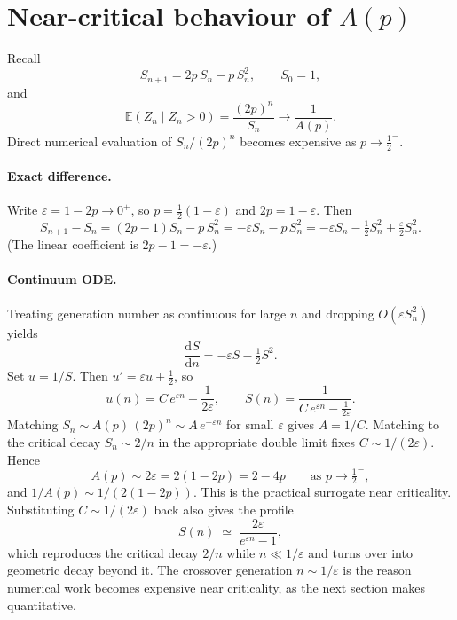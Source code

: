\section{Near-critical behaviour of \texorpdfstring{$A(p)$}{A(p)}}
\label{sec:nearcrit}

Recall
\[
S_{n+1}=2p\,S_n-p\,S_n^2,\qquad S_0=1,
\]
and
\[
\mathbb{E}(Z_n\mid Z_n>0)=\frac{(2p)^n}{S_n}\to\frac{1}{A(p)} .
\]
Direct numerical evaluation of $S_n/(2p)^n$ becomes expensive as $p\to\tfrac12^-$.

\paragraph{Exact difference.}
Write $\varepsilon=1-2p\to0^+$, so $p=\tfrac12(1-\varepsilon)$ and $2p=1-\varepsilon$. Then
\begin{equation}
S_{n+1}-S_n
=
(2p-1)S_n-p\,S_n^2
=
-\varepsilon S_n-p\,S_n^2
=
-\varepsilon S_n-\tfrac12 S_n^2+\tfrac{\varepsilon}{2}S_n^2.
\end{equation}
(The linear coefficient is $2p-1=-\varepsilon$.)

\paragraph{Continuum ODE.}
Treating generation number as continuous for large $n$ and dropping $O(\varepsilon S_n^2)$ yields
\begin{equation}
\frac{\mathrm{d}S}{\mathrm{d}n}
=
-\varepsilon S-\tfrac12 S^2.
\end{equation}
Set $u=1/S$. Then $u'=\varepsilon u+\tfrac12$, so
\[
u(n)=C\,e^{\varepsilon n}-\frac{1}{2\varepsilon},
\qquad
S(n)=\frac{1}{C\,e^{\varepsilon n}-\frac{1}{2\varepsilon}}.
\]
Matching $S_n\sim A(p)\,(2p)^n\sim A\,e^{-\varepsilon n}$ for small $\varepsilon$ gives $A=1/C$. Matching to the critical decay $S_n\sim 2/n$ in the appropriate double limit fixes $C\sim 1/(2\varepsilon)$. Hence
\begin{equation}
A(p)\sim 2\varepsilon = 2(1-2p)=2-4p
\qquad\text{as }p\to\tfrac12^-,
\end{equation}
and $1/A(p)\sim 1/(2(1-2p))$. This is the practical surrogate near criticality.
Substituting $C\sim1/(2\varepsilon)$ back also gives the profile
\begin{equation}
S(n)\;\simeq\;\frac{2\varepsilon}{e^{\varepsilon n}-1},
\label{eq:nearcrit-profile}
\end{equation}
which reproduces the critical decay $2/n$ while $n\ll1/\varepsilon$ and turns over
into geometric decay beyond it. The crossover generation $n\sim1/\varepsilon$ is the
reason numerical work becomes expensive near criticality, as the next section makes
quantitative.



